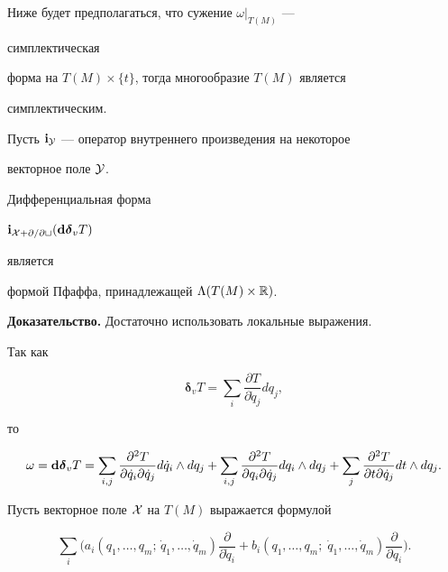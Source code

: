  


Ниже будет предполагаться, что сужение $\omega|_{T(M)}$ --- 


симплектическая 


форма на $T(M)\times\{t\}$, тогда многообразие $T(M)$ является 


симплектическим. 


 


Пусть $\bold i_{\cal Y}$ --- оператор внутреннего произведения на некоторое 


векторное поле $\cal Y$. 


 


\begin{lem} 


Дифференциальная форма


$\bold i_{\cal X+\partial/\partial t}(\bold d\boldsymbol \delta_v T)$ 


является 


формой Пфаффа, принадлежащей $\Lambda(T(M)\times\Bbb R)$. 


\end{lem} 


 


{\bf Доказательство.} Достаточно использовать локальные выражения. 


Так как 


$$ 


\boldsymbol \delta_v T=\sum_i\frac{\partial T}{\partial \Dot q_j}dq_j, 


$$ 


то 


$$ 


\omega=\bold d\boldsymbol \delta_v T=\sum_{i,j} 


\frac{\partial^2T}{\partial\Dot q_i\partial\Dot q_j}d\Dot q_i 


\wedge dq_j+\sum_{i,j} 


\frac{\partial^2T}{\partial q_i\partial\Dot q_j}dq_i\wedge 


dq_j+\sum_j 


\frac{\partial^2T}{\partial t\partial\Dot q_j}dt\wedge dq_j.


$$ 


 


Пусть векторное поле $\cal X$ на $T(M)$ выражается формулой 


\begin{equation} 


\sum_i\bigg(a_i(q_1,\dotsc,q_m;\,\Dot q_1,\dotsc,\Dot q_m) 


\frac{\partial}{\partial\Dot q_i}+b_i(q_1,\dotsc,q_m;\; 


\Dot q_1,\dotsc,\Dot q_m)\frac{\partial}{\partial q_i}\bigg). 


\end{equation} 


